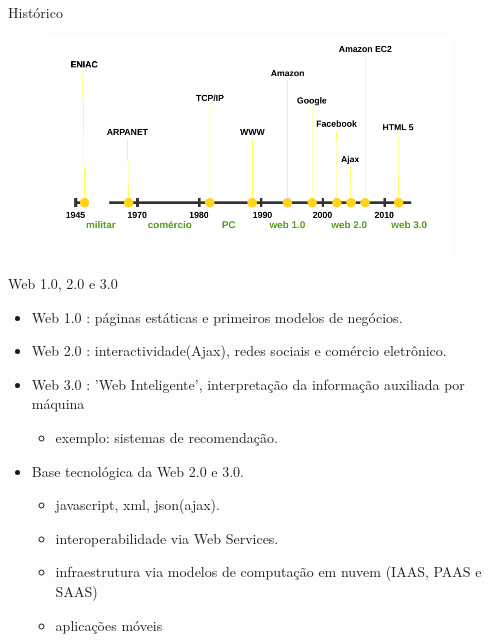 \begin{frame}[fragile,t]{Histórico}
  \begin{figure}[h!]
    \centering
    \includegraphics[width=0.95\textwidth]{imagens/historico.png}
  \end{figure} 
\end{frame}
\begin{frame}[fragile,t]{Web 1.0, 2.0 e 3.0}
  \begin{itemize}
    \item \alert{Web 1.0} : páginas estáticas e primeiros modelos de negócios.
    \item \alert{Web 2.0} : interactividade(Ajax), redes sociais e comércio eletrônico.
    \item \alert{Web 3.0} : 'Web Inteligente', interpretação da informação auxiliada por máquina 
    \begin{itemize}
      \item exemplo: sistemas de recomendação.
    \end{itemize}
    \item Base \alert{tecnológica} da Web 2.0 e 3.0.
    \begin{itemize}
      \item javascript, xml, json(ajax).
      \item interoperabilidade via Web Services.
      \item infraestrutura via modelos de \alert{computação em nuvem} (IAAS, PAAS e SAAS)
      \item aplicações móveis
    \end{itemize}
  \end{itemize}
\end{frame}

